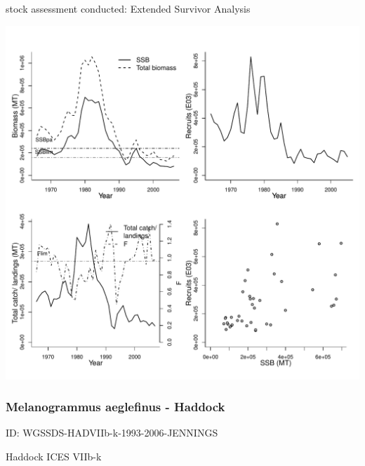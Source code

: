 stock assessment conducted: Extended Survivor Analysis 
\begin{center}
\vspace{-0.2cm}\includegraphics[scale=0.65]{../tex/figures/plot-WGBFAS-CODBA2532-1964-2007-JENNINGS.pdf}
\end{center}

\newpage
\subsubsection{Melanogrammus aeglefinus - Haddock}
ID: WGSSDS-HADVIIb-k-1993-2006-JENNINGS

Haddock ICES VIIb-k 

